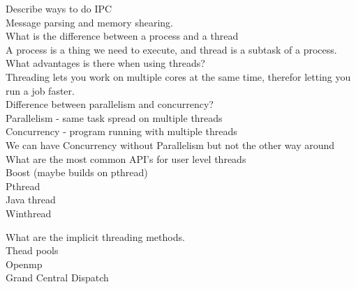 \documentclass[a4paper,10pt,titlepage]{report}
\begin{document}
\vspace{5mm}
Describe ways to do IPC\\
\hspace{10mm}Message parsing and memory shearing. \\




\vspace{5mm}
What is the difference between a process and a thread\\
\hspace{10mm}A process is a thing we need to execute, and thread is a subtask of a process.\\


\vspace{5mm}
What advantages is there when using threads?\\
\hspace{10mm}Threading lets you work on multiple cores at the same time, therefor letting you run a job faster.\\


\vspace{5mm}
Difference between parallelism and concurrency?\\

\hspace{10mm}	Parallelism - same task spread on multiple threads\\
\hspace{10mm}	Concurrency - program running with multiple threads\\
\hspace{10mm}  	We can have Concurrency without Parallelism but not the other way around\\



\vspace{5mm}
What are the most common API's for user level threads\\
\hspace{10mm} Boost (maybe builds on pthread) \\
\hspace{10mm} Pthread \\
\hspace{10mm} Java thread \\
\hspace{10mm} Winthread \\
\vspace{5mm}



What are the implicit threading methods.\\
\hspace{10mm} Thead pools \\
\hspace{10mm} Openmp \\
\hspace{10mm} Grand Central Dispatch \\
\end{document}
